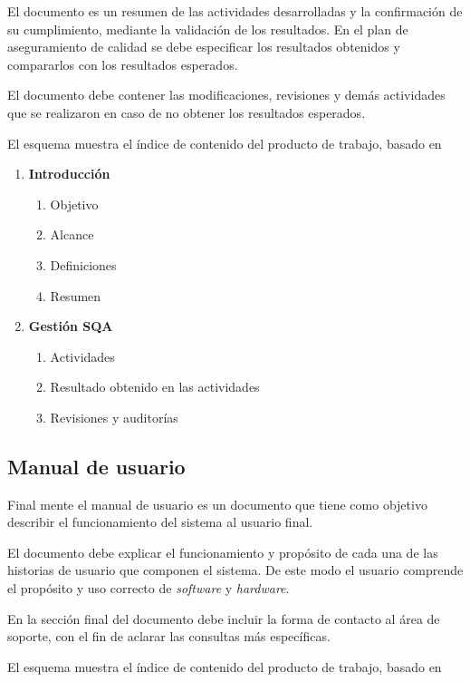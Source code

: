 El documento es un resumen de las actividades desarrolladas y la confirmación de su cumplimiento, mediante la validación de los resultados. En el plan de aseguramiento de calidad se debe especificar los resultados obtenidos y compararlos con los resultados esperados.

El documento debe contener las modificaciones, revisiones y demás actividades que se realizaron en caso de no obtener los resultados esperados.

El esquema muestra el índice de contenido del producto de trabajo, basado en \citet{mem00}

\begin{framed}
    \begin{enumerate}
		\item \textbf{Introducción}
		\begin{enumerate}
			\item Objetivo
			\item Alcance
			\item Definiciones
			\item Resumen
		\end{enumerate}
		\item \textbf{Gestión SQA}
		\begin{enumerate}
			\item Actividades
			\item Resultado obtenido en las actividades
			\item Revisiones y auditorías
		\end{enumerate}
	\end{enumerate}
\end{framed}

\subsection{Manual de usuario}
Final mente el manual de usuario es un documento que tiene como objetivo describir el funcionamiento del sistema al usuario final. 

El documento debe explicar el funcionamiento y propósito de cada una de las historias de usuario que componen el sistema. De este modo el usuario comprende el propósito y uso correcto de \textit{software} y \textit{hardware}.

En la sección final del documento debe incluir la forma de contacto al área de soporte, con el fin de aclarar las consultas más específicas.

El esquema muestra el índice de contenido del producto de trabajo, basado en \citet{mem00}

